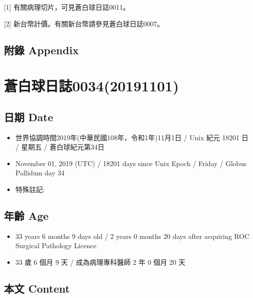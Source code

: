 \documentclass[a5paper, 12pt
]{book}
\providecommand{\tightlist}{%
  \setlength{\itemsep}{0pt}\setlength{\parskip}{0pt}}
\begin{document}
{[}1{]} 有關病理切片，可見蒼白球日誌0011。

{[}2{]} 新台幣計價。有關新台幣請參見蒼白球日誌0007。

\hypertarget{ux9644ux9304-appendix-25}{%
\subsection{附錄 Appendix}\label{ux9644ux9304-appendix-25}}

\hypertarget{ux84bcux767dux7403ux65e5ux8a8c003420191101}{%
\section{蒼白球日誌0034(20191101)}\label{ux84bcux767dux7403ux65e5ux8a8c003420191101}}

\hypertarget{ux65e5ux671f-date-33}{%
\subsection{日期 Date}\label{ux65e5ux671f-date-33}}

\begin{itemize}
\tightlist
\item
  世界協調時間2019年(中華民國108年，令和1年)11月1日 / Unix 紀元 18201 日
  / 星期五 / 蒼白球紀元第34日
\item
  November 01, 2019 (UTC) / 18201 days since Unix Epoch / Friday /
  Globus Pallidum day 34
\item
  特殊註記:
\end{itemize}

\hypertarget{ux5e74ux9f61-age-33}{%
\subsection{年齡 Age}\label{ux5e74ux9f61-age-33}}

\begin{itemize}
\tightlist
\item
  33 years 6 months 9 days old / 2 years 0 months 20 days after
  acquiring ROC Surgical Pathology Licence
\item
  33 歲 6 個月 9 天 / 成為病理專科醫師 2 年 0 個月 20 天
\end{itemize}

\hypertarget{ux672cux6587-content-33}{%
\subsection{本文 Content}\label{ux672cux6587-content-33}}
\end{document}
